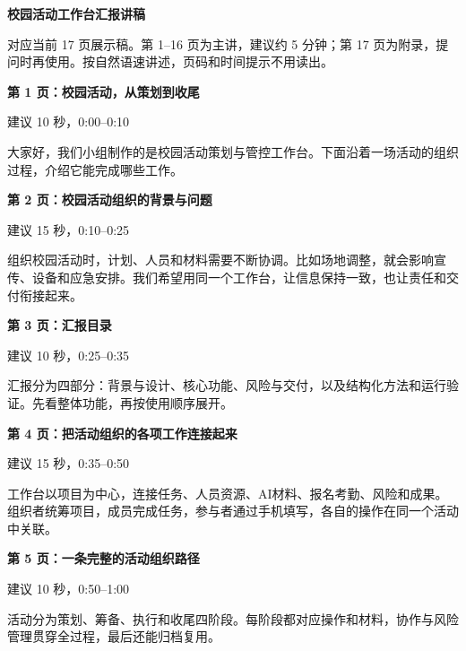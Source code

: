 \documentclass[UTF8,fontset=windows,zihao=-4,a4paper]{ctexart}
\begin{document}
\begin{center}{\Large\bfseries\color{ink}校园活动工作台汇报讲稿}\end{center}
对应当前 17 页展示稿。第 1–16 页为主讲，建议约 5 分钟；第 17 页为附录，提问时再使用。按自然语速讲述，页码和时间提示不用读出。

{\large\bfseries\color{ink}第 1 页：校园活动，从策划到收尾}\par
{\small\color{gray}建议 10 秒，0:00–0:10}\par
大家好，我们小组制作的是校园活动策划与管控工作台。下面沿着一场活动的组织过程，介绍它能完成哪些工作。\par\vspace{8pt}

{\large\bfseries\color{ink}第 2 页：校园活动组织的背景与问题}\par
{\small\color{gray}建议 15 秒，0:10–0:25}\par
组织校园活动时，计划、人员和材料需要不断协调。比如场地调整，就会影响宣传、设备和应急安排。我们希望用同一个工作台，让信息保持一致，也让责任和交付衔接起来。\par\vspace{8pt}

{\large\bfseries\color{ink}第 3 页：汇报目录}\par
{\small\color{gray}建议 10 秒，0:25–0:35}\par
汇报分为四部分：背景与设计、核心功能、风险与交付，以及结构化方法和运行验证。先看整体功能，再按使用顺序展开。\par\vspace{8pt}

{\large\bfseries\color{ink}第 4 页：把活动组织的各项工作连接起来}\par
{\small\color{gray}建议 15 秒，0:35–0:50}\par
工作台以项目为中心，连接任务、人员资源、AI材料、报名考勤、风险和成果。组织者统筹项目，成员完成任务，参与者通过手机填写，各自的操作在同一个活动中关联。\par\vspace{8pt}

{\large\bfseries\color{ink}第 5 页：一条完整的活动组织路径}\par
{\small\color{gray}建议 10 秒，0:50–1:00}\par
活动分为策划、筹备、执行和收尾四阶段。每阶段都对应操作和材料，协作与风险管理贯穿全过程，最后还能归档复用。\par\vspace{8pt}
\end{document}
